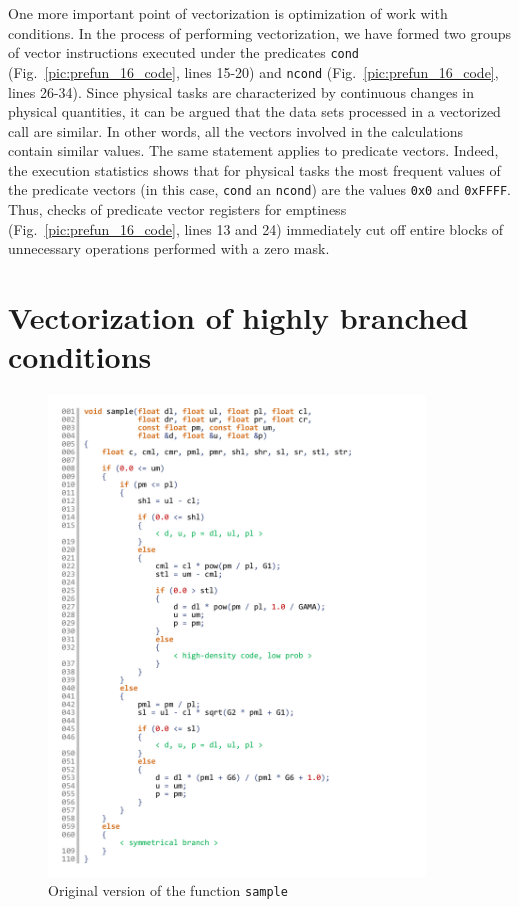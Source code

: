 \documentclass[utf8,english]{psta}%
\begin{document}
One more important point of vectorization is optimization of work with conditions.
In the process of performing vectorization, we have formed two groups of vector instructions executed under the predicates \texttt{cond} (Fig.~\ref{pic:prefun_16_code}, lines 15-20) and \texttt{ncond} (Fig.~\ref{pic:prefun_16_code}, lines 26-34).
Since physical tasks are characterized by continuous changes in physical quantities, it can be argued that the data sets processed in a vectorized call are similar.
In other words, all the vectors involved in the calculations contain similar values.
The same statement applies to predicate vectors.
Indeed, the execution statistics shows that for physical tasks the most frequent values of the predicate vectors (in this case, \texttt{cond} an \texttt{ncond}) are the values \texttt{0x0} and \texttt{0xFFFF}.
Thus, checks of predicate vector registers for emptiness (Fig.~\ref{pic:prefun_16_code}, lines 13 and 24) immediately cut off entire blocks of unnecessary operations performed with a zero mask.

\section{Vectorization of highly branched conditions}

\begin{figure}
\includegraphics[width=10cm]{pics/pic_sample_code_4}
\caption{Original version of the function \texttt{sample}}
\label{pic:sample_code_4}
\end{figure}
\end{document}
